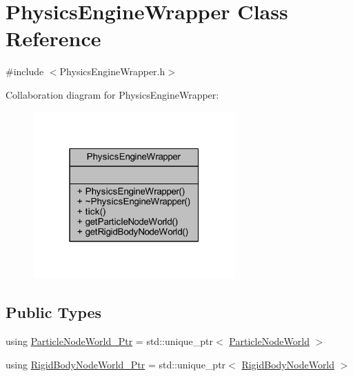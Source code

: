 \hypertarget{class_physics_engine_wrapper}{}\section{Physics\+Engine\+Wrapper Class Reference}
\label{class_physics_engine_wrapper}


{\ttfamily \#include $<$Physics\+Engine\+Wrapper.\+h$>$}



Collaboration diagram for Physics\+Engine\+Wrapper\+:\nopagebreak
\begin{figure}[H]
\begin{center}
\leavevmode
\includegraphics[width=220pt]{class_physics_engine_wrapper__coll__graph}
\end{center}
\end{figure}
\subsection*{Public Types}
\begin{DoxyCompactItemize}
\item 
using \mbox{\hyperlink{class_physics_engine_wrapper_a842bf2a6668082cbc4568e0212d16cc9}{Particle\+Node\+World\+\_\+\+Ptr}} = std\+::unique\+\_\+ptr$<$ \mbox{\hyperlink{class_particle_node_world}{Particle\+Node\+World}} $>$
\item 
using \mbox{\hyperlink{class_physics_engine_wrapper_a3c72d58c14dbb32642177a6a7aa73368}{Rigid\+Body\+Node\+World\+\_\+\+Ptr}} = std\+::unique\+\_\+ptr$<$ \mbox{\hyperlink{class_rigid_body_node_world}{Rigid\+Body\+Node\+World}} $>$
\end{DoxyCompactItemize}
